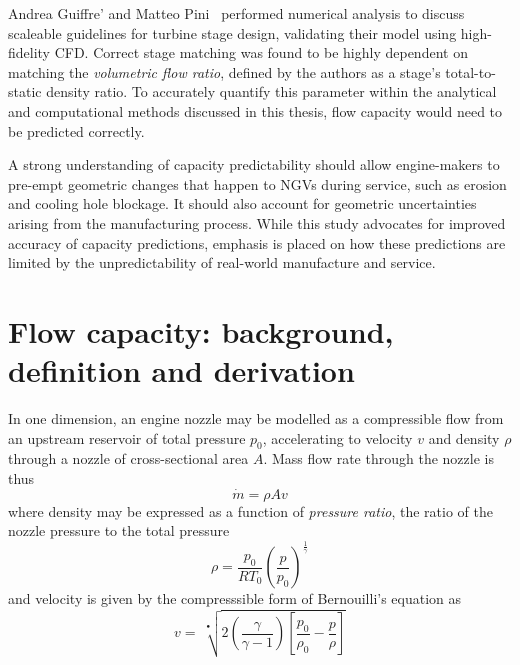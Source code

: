 \documentclass[a4paper, 11pt, twoside]{report}
\begin{document}
Andrea Guiffre' and Matteo Pini~\cite{guiffre_design_guidelines} performed numerical analysis to discuss scaleable guidelines for turbine stage design, validating their model using high-fidelity CFD.  Correct stage matching was found to be highly dependent on matching the \textit{volumetric flow ratio}, defined by the authors as a stage's total-to-static density ratio. To accurately quantify this parameter within the analytical and computational methods discussed in this thesis, flow capacity would need to be predicted correctly.

A strong understanding of capacity predictability should allow engine-makers to pre-empt geometric changes that happen to NGVs during service, such as erosion and cooling hole blockage. It should also account for geometric uncertainties arising from the manufacturing process. While this study advocates for improved accuracy of capacity predictions, emphasis is placed on how these predictions are limited by the unpredictability of real-world manufacture and service.

\section{Flow capacity: background, definition and derivation}
\label{flow_capacity_background_definition_and_derivation}

In one dimension, an engine nozzle may be modelled as a compressible flow from an upstream reservoir of total pressure $p_0$, accelerating to velocity $v$ and density $\rho$ through a nozzle of cross-sectional area $A$. Mass flow rate through the nozzle is thus
\begin{equation}
\dot{m} = \rho A v
\end{equation}
where density may be expressed as a function of \textit{pressure ratio}, the ratio of the nozzle pressure to the total pressure
\begin{equation}
\rho = \frac{p_0}{R T_0} \left(\frac{p}{p_0}\right)^\frac{1}{\gamma}
\end{equation}
and velocity is given by the compresssible form of Bernouilli's equation as
\begin{equation}
v = \>
\sqrt[•]{ 
	2 \left( \frac{\gamma}{\gamma - 1} \right) \left[ \frac{p_0}{\rho_0} - \frac{p}{\rho} \right] 
}
\end{equation}
\end{document}
